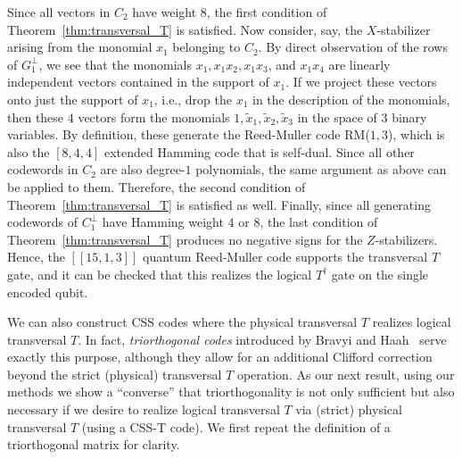 \documentclass[twoside,romanappendices]{IEEEtran}
\newcommand{\llbr}{[\![}
\newcommand{\rrbr}{]\!]}
\begin{document}

Since all vectors in $C_2$ have weight $8$, the first condition of Theorem~\ref{thm:transversal_T} is satisfied.
Now consider, say, the $X$-stabilizer arising from the monomial $x_1$ belonging to $C_2$.
By direct observation of the rows of $G_1^{\perp}$, we see that the monomials $x_1, x_1 x_2, x_1 x_3$, and $x_1 x_4$ are linearly independent vectors contained in the support of $x_1$.
If we project these vectors onto just the support of $x_1$, i.e., drop the $x_1$ in the description of the monomials, then these $4$ vectors form the monomials $1, \tilde{x}_1, \tilde{x}_2, \tilde{x}_3$ in the space of $3$ binary variables.
By definition, these generate the Reed-Muller code RM($1,3$), which is also the $[8,4,4]$ extended Hamming code that is self-dual.
Since all other codewords in $C_2$ are also degree-$1$ polynomials, the same argument as above can be applied to them.
Therefore, the second condition of Theorem~\ref{thm:transversal_T} is satisfied as well.
Finally, since all generating codewords of $C_1^{\perp}$ have Hamming weight $4$ or $8$, the last condition of Theorem~\ref{thm:transversal_T} produces no negative signs for the $Z$-stabilizers.
Hence, the $\llbr 15,1,3 \rrbr$ quantum Reed-Muller code supports the transversal $T$ gate, and it can be checked that this realizes the logical $T^{\dagger}$ gate on the single encoded qubit.



We can also construct CSS codes where the physical transversal $T$ realizes logical transversal $T$.
In fact, \emph{triorthogonal codes} introduced by Bravyi and Haah~\cite{Bravyi-pra12} serve exactly this purpose, although they allow for an additional Clifford correction beyond the strict (physical) transversal $T$ operation.
As our next result, using our methods we show a ``converse'' that triorthogonality is not only sufficient but also necessary if we desire to realize logical transversal $T$ via (strict) physical transversal $T$ (using a CSS-T code).
We first repeat the definition of a triorthogonal matrix for clarity.
\end{document}
